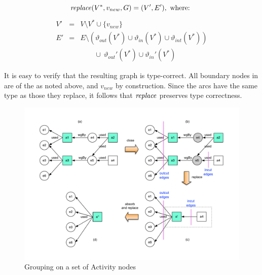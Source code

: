 % 

\noindent
{}
\vspace*{10pt}
\begin{definition}[replace]
\label{def:group-replace}

\[ \mathit{replace} (V^*, v_{new}, G) = (V', E'), \mbox{ where: } \]
\begin{eqnarray*}
V' & = & V  \setminus V^*  \cup \{v_{new}\}\\
E' & = & E  \setminus (\vartheta_{out}(V^*) \cup \vartheta_{in}(V^*) \cup \vartheta_{int}(V^*))  \\
   & & \qquad \cup\  \vartheta_{out}'(V^*)  \cup \vartheta_{in}'(V^*)
\end{eqnarray*}
\end{definition}

It is easy to verify that the resulting graph is type-correct. All boundary nodes in   are of the  as noted above, and   $v_{new}$   by construction.
Since the arcs have the same type as those they replace, it follows that $\mathit{replace}$ preserves type correctness.



\begin{figure}
\centering
\includegraphics[scale=.5]{figures/convex-a-only-revision.pdf} 
\caption{Grouping on a set of Activity nodes} \label{fig:convex-a-only}
\end{figure}

